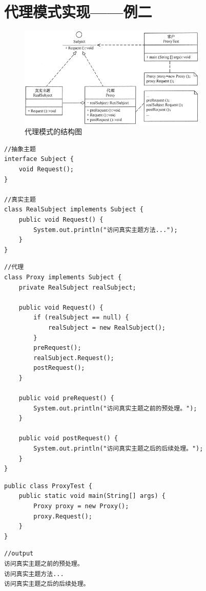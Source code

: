 \section{代理模式实现——例二}
\begin{figure}[!h]
	\centering
	\includegraphics[width=0.8\textwidth]{image/21-3}
	\caption{代理模式的结构图}
\end{figure}
\begin{lstlisting}
//抽象主题
interface Subject {
	void Request();
}

//真实主题
class RealSubject implements Subject {
	public void Request() {
		System.out.println("访问真实主题方法...");
	}
}
\end{lstlisting}
\begin{lstlisting}
//代理
class Proxy implements Subject {
	private RealSubject realSubject;
	
	public void Request() {
		if (realSubject == null) {
			realSubject = new RealSubject();
		}
		preRequest();
		realSubject.Request();
		postRequest();
	}
	
	public void preRequest() {
		System.out.println("访问真实主题之前的预处理。");
	}
	
	public void postRequest() {
		System.out.println("访问真实主题之后的后续处理。");
	}
}
\end{lstlisting}
\begin{lstlisting}
public class ProxyTest {
	public static void main(String[] args) {
		Proxy proxy = new Proxy();
		proxy.Request();
	}
}
\end{lstlisting}
\begin{lstlisting}
//output
访问真实主题之前的预处理。
访问真实主题方法...
访问真实主题之后的后续处理。
\end{lstlisting}
